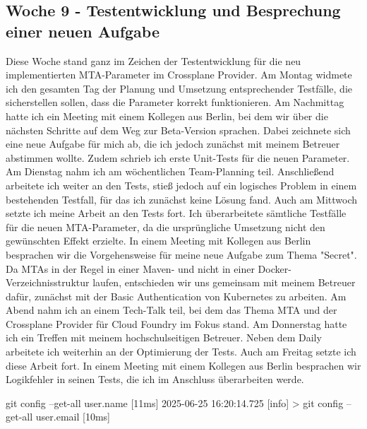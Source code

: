 \subsection{Woche 9 - Testentwicklung und Besprechung einer neuen Aufgabe}
Diese Woche stand ganz im Zeichen der Testentwicklung für die neu
implementierten MTA-Parameter im Crossplane Provider.
Am Montag widmete ich den gesamten Tag der Planung und Umsetzung
entsprechender Testfälle, die sicherstellen sollen, dass die Parameter korrekt
funktionieren. Am Nachmittag hatte ich ein Meeting mit einem Kollegen aus Berlin,
bei dem wir über die nächsten Schritte auf dem Weg zur Beta-Version sprachen.
Dabei zeichnete sich eine neue Aufgabe für mich ab, die ich jedoch zunächst mit
meinem Betreuer abstimmen wollte. Zudem schrieb ich erste Unit-Tests für die
neuen Parameter.
Am Dienstag nahm ich am wöchentlichen Team-Planning teil. Anschließend
arbeitete ich weiter an den Tests, stieß jedoch auf ein logisches Problem in einem
bestehenden Testfall, für das ich zunächst keine Lösung fand.
Auch am Mittwoch setzte ich meine Arbeit an den Tests fort. Ich überarbeitete
sämtliche Testfälle für die neuen MTA-Parameter, da die ursprüngliche Umsetzung
nicht den gewünschten Effekt erzielte. In einem Meeting mit Kollegen aus Berlin
besprachen wir die Vorgehensweise für meine neue Aufgabe zum Thema "Secret". Da
MTAs in der Regel in einer Maven- und nicht in einer Docker-Verzeichnisstruktur
laufen, entschieden wir uns gemeinsam mit meinem Betreuer dafür, zunächst mit
der Basic Authentication von Kubernetes zu arbeiten. Am Abend nahm ich an einem
Tech-Talk teil, bei dem das Thema MTA und der Crossplane Provider für Cloud
Foundry im Fokus stand.
Am Donnerstag hatte ich ein Treffen mit meinem hochschulseitigen Betreuer. Neben
dem Daily arbeitete ich weiterhin an der Optimierung der Tests. Auch am Freitag
setzte ich diese Arbeit fort. In einem Meeting mit einem Kollegen aus Berlin
besprachen wir Logikfehler in seinen Tests, die ich im Anschluss überarbeiten werde.

git config --get-all user.name [11ms]
2025-06-25 16:20:14.725 [info] > git config --get-all user.email [10ms]


